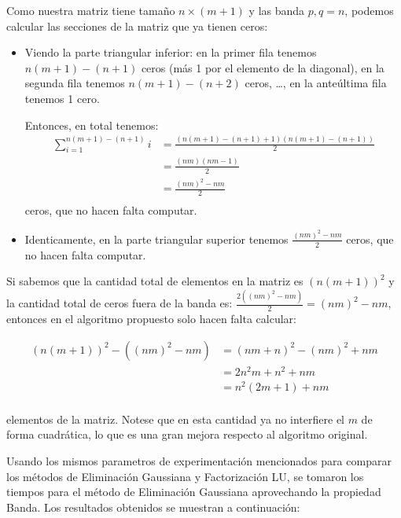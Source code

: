 Como nuestra matriz tiene tamaño $n\times(m+1)$ y las banda $p,q = n$, podemos calcular las secciones de la matriz que ya tienen ceros:
\begin{itemize}
    \item Viendo la parte triangular inferior: en la primer fila tenemos $n(m+1) - (n+1)$ ceros (más 1 por el elemento de la diagonal), en la segunda fila tenemos $n(m+1) - (n+2)$ ceros, \dots, en la anteúltima fila tenemos 1 cero.

        Entonces, en total tenemos:
        \begin{equation*}
            \begin{aligned}
            \sum\limits_{i = 1}^{n(m+1) - (n+1)}{i} &= \frac{(n(m+1) - (n+1) + 1)(n(m+1) - (n+1))}{2} \\
                                                    &= \frac{(nm)(nm -1)}{2} \\
                                                    &= \frac{(nm)^2 -nm}{2} \\
            \end{aligned}
        \end{equation*}
        ceros, que no hacen falta computar.
    \item Identicamente, en la parte triangular superior tenemos  $\frac{(nm)^2 -nm}{2}$ ceros, que no hacen falta computar.
\end{itemize}

Si sabemos que la cantidad total de elementos en la matriz es $(n(m+1))^2$ y la cantidad total de ceros fuera de la banda es: $\frac{2((nm)^2 -nm)}{2} = (nm)^2 -nm$, entonces en el algoritmo propuesto solo hacen falta calcular:

\begin{equation*}
    \begin{aligned}
    (n(m+1))^2 - ((nm)^2 - nm) &= (nm + n)^2 - (nm)^2 + nm\\
                               &= 2n^2m+n^2+nm \\
                               &= n^2(2m + 1)+nm \\
    \end{aligned}
\end{equation*}

elementos de la matriz. Notese que en esta cantidad ya no interfiere el $m$ de forma cuadrática, lo que es una gran mejora respecto al algoritmo original.

Usando los mismos parametros de experimentación mencionados para comparar los métodos de Eliminación Gaussiana y Factorización LU, se tomaron los tiempos para el método de Eliminación Gaussiana aprovechando la propiedad Banda.
Los resultados obtenidos se muestran a continuación:

